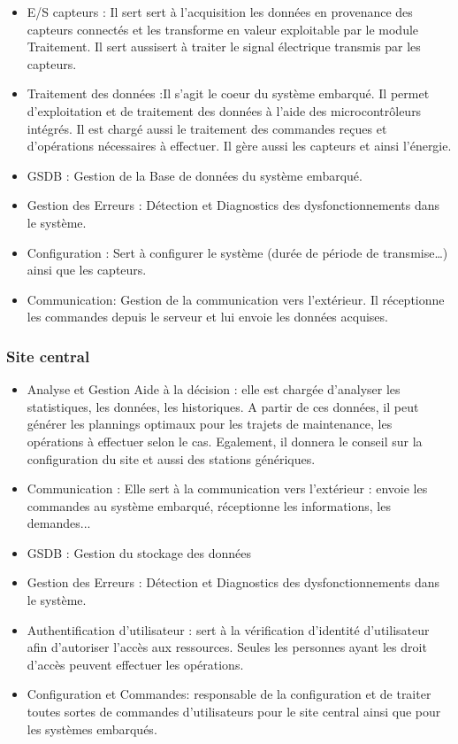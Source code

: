 	\begin{itemize}
	    \item E/S capteurs : Il sert sert à l'acquisition les données en provenance des capteurs connectés et les transforme en valeur exploitable par le module Traitement. Il sert aussisert à traiter le signal électrique transmis par les capteurs.
	    \item Traitement des données :Il s'agit le coeur du système embarqué.  Il permet d'exploitation et de traitement des données à l’aide des microcontrôleurs intégrés. Il est chargé aussi le traitement des commandes reçues et d'opérations nécessaires à effectuer. Il gère aussi les capteurs et ainsi l'énergie.
	    \item GSDB : Gestion de la Base de données du système embarqué. 
	    \item Gestion des Erreurs : Détection et Diagnostics des dysfonctionnements dans le système.
	    \item Configuration : Sert à configurer le système (durée de période de transmise…) ainsi que les capteurs.
	    \item Communication: Gestion de la communication vers l’extérieur. Il réceptionne les commandes depuis le serveur et lui envoie les données acquises. 
	\end{itemize}

\subsubsection{Site central}

	\begin{itemize}
	    \item Analyse et Gestion Aide à la décision : elle est chargée d’analyser les statistiques, les données, les historiques. A partir de ces données, il peut générer les plannings optimaux pour les trajets de maintenance, les opérations à effectuer selon le cas. Egalement, il donnera le conseil sur la configuration du site et aussi des stations génériques.
 
	    \item Communication : Elle sert à la communication vers l’extérieur : envoie les commandes au système embarqué, réceptionne les informations, les demandes... 
	    \item GSDB : Gestion du stockage des données
	    \item Gestion des Erreurs : Détection et Diagnostics des dysfonctionnements dans le système.
	    \item Authentification d’utilisateur : sert à la vérification d’identité d’utilisateur afin d’autoriser l’accès aux ressources. Seules les personnes ayant les droit d’accès peuvent effectuer les opérations.
		\item Configuration et Commandes: responsable de la configuration et de traiter toutes sortes de commandes d’utilisateurs pour le site central ainsi que pour les systèmes embarqués. 

	\end{itemize}

